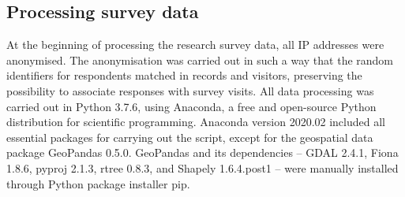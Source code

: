 \subsection{Processing survey data}
\label{sec:processdata} %
\justify


At the beginning of processing the research survey data, all IP addresses were anonymised. The anonymisation was carried out in such a way that the random identifiers for respondents matched in records and visitors, preserving the possibility to associate responses with survey visits. All data processing was carried out in Python 3.7.6, using Anaconda, a free and open-source Python distribution for scientific programming. Anaconda version 2020.02 included all essential packages for carrying out the script, except for the geospatial data package GeoPandas 0.5.0. GeoPandas and its dependencies -- GDAL 2.4.1, Fiona 1.8.6, pyproj 2.1.3, rtree 0.8.3, and Shapely 1.6.4.post1 -- were manually installed through Python package installer pip.

